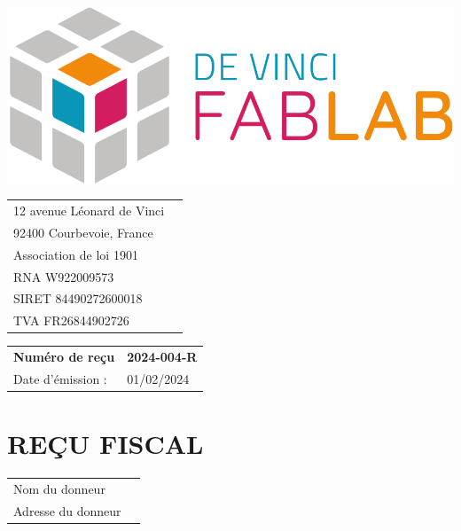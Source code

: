 \documentclass[11pt,a4paper]{article}
\begin{document}
\thispagestyle{empty}


\begin{minipage}{0.4\textwidth}
    \includegraphics[width=0.7\linewidth]{../assets/logo_fablab.png}

    \vspace{0.5cm}

    \begin{tabular}{ll}
        12 avenue Léonard de Vinci \\
        92400 Courbevoie, France   \\
        Association de loi 1901    \\
        RNA W922009573             \\
        SIRET 84490272600018       \\
        TVA  FR26844902726         \\
    \end{tabular}
\end{minipage}\begin{minipage}{0.6\textwidth}
    \begin{flushright}
        \begin{tabular}{ll}
            \textbf{Numéro de reçu} & \textbf{2024-004-R} \\
            Date d'émission :       & 01/02/2024          \\
        \end{tabular}
    \end{flushright}
\end{minipage}

\begin{minipage}[t]{0.5\textwidth}
    \hspace*{0pt}\vspace*{\fill}
    \section*{\LARGE REÇU FISCAL}
\end{minipage}\begin{minipage}[t]{0.5\textwidth}
    \begin{framed}
        \begin{tabular}{ll}
            Nom du donneur     \\
            Adresse du donneur \\
        \end{tabular}
    \end{framed}
    \vspace{0.1cm}
\end{minipage}
\end{document}
